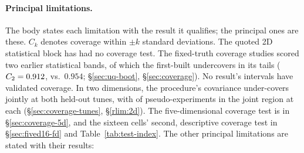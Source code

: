 \paragraph{Principal limitations.} The body states each limitation with the result it qualifies; the principal ones are these. $C_k$ denotes coverage within $\pm k$ standard deviations. The quoted 2D statistical block has had no coverage test. The fixed-truth coverage studies scored two earlier statistical bands, of which the first-built undercovers in its tails ($C_2=0.912$, vs.\ $0.954$; \S\ref{sec:uq-boot}, \S\ref{sec:coverage}). No result's intervals have validated coverage. In two dimensions, the procedure's covariance under-covers jointly at both held-out tunes, with  of  pseudo-experiments in the joint region at each (\S\ref{sec:coverage-tunes}, \S\ref{rlim:2d}). The five-dimensional coverage test is in \S\ref{sec:coverage-5d}, and the sixteen cells' second, descriptive coverage test in \S\ref{sec:fived16-fd} and Table~\ref{tab:test-index}. The other principal limitations are stated with their results:
